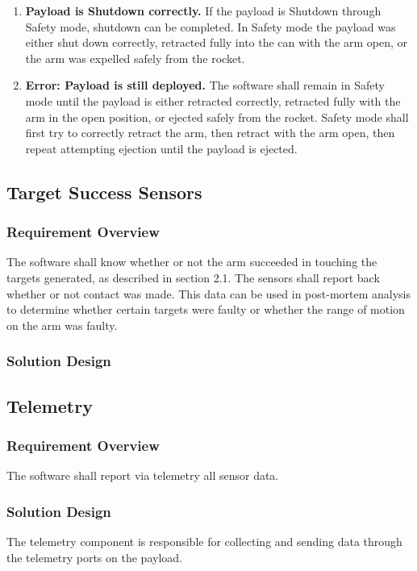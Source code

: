 \documentclass[letterpaper,10pt]{article}
\begin{document}
\begin{center}
\begin{enumerate}
\item{\textbf{Payload is Shutdown correctly.} If the payload is Shutdown through Safety mode, shutdown can be completed. In Safety mode the payload was either shut down correctly, retracted fully into the can with the arm open, or the arm was expelled safely from the rocket.}
\item{\textbf{Error: Payload is still deployed.} The software shall remain in Safety mode until the payload is either retracted correctly, retracted fully with the arm in the open position, or ejected safely from the rocket. Safety mode shall first try to correctly retract the arm, then retract with the arm open, then repeat attempting ejection until the payload is ejected.}
\end{enumerate}
\end{center}

\subsection{Target Success Sensors}
\subsubsection{Requirement Overview}
The software shall know whether or not the arm succeeded in touching the targets generated, as described in section 2.1. The sensors
shall report back whether or not contact was made. This data can be used in post-mortem analysis to determine whether
certain targets were faulty or whether the range of motion on the arm was faulty.
\subsubsection{Solution Design}

\subsection{Telemetry}
\subsubsection{Requirement Overview}
The software shall report via telemetry all sensor data.

\subsubsection{Solution Design}
The telemetry component is responsible for collecting and sending data through the
telemetry ports on the \gls{payload}.
\end{document}
